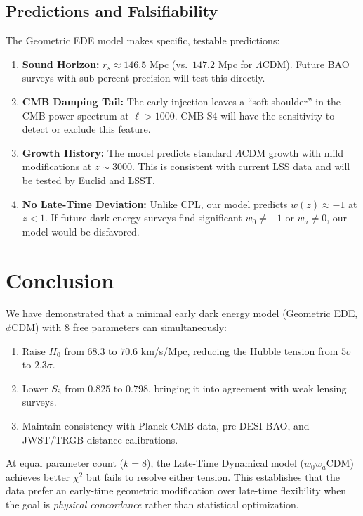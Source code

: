 \subsection{Predictions and Falsifiability}

The Geometric EDE model makes specific, testable predictions:

\begin{enumerate}
    \item \textbf{Sound Horizon:} $r_s \approx 146.5$ Mpc (vs.\ $147.2$ Mpc for $\Lambda$CDM). Future BAO surveys with sub-percent precision will test this directly.
    
    \item \textbf{CMB Damping Tail:} The early injection leaves a ``soft shoulder'' in the CMB power spectrum at $\ell > 1000$. CMB-S4 will have the sensitivity to detect or exclude this feature.
    
    \item \textbf{Growth History:} The model predicts standard $\Lambda$CDM growth with mild modifications at $z \sim 3000$. This is consistent with current LSS data and will be tested by Euclid and LSST.
    
    \item \textbf{No Late-Time Deviation:} Unlike CPL, our model predicts $w(z) \approx -1$ at $z < 1$. If future dark energy surveys find significant $w_0 \neq -1$ or $w_a \neq 0$, our model would be disfavored.
\end{enumerate}

\section{Conclusion}

We have demonstrated that a minimal early dark energy model (Geometric EDE, $\phi$CDM) with 8 free parameters can simultaneously:

\begin{enumerate}
    \item Raise $H_0$ from $68.3$ to $70.6$ km/s/Mpc, reducing the Hubble tension from $5\sigma$ to $2.3\sigma$.
    \item Lower $S_8$ from $0.825$ to $0.798$, bringing it into agreement with weak lensing surveys.
    \item Maintain consistency with Planck CMB data, pre-DESI BAO, and JWST/TRGB distance calibrations.
\end{enumerate}

At equal parameter count ($k = 8$), the Late-Time Dynamical model ($w_0w_a$CDM) achieves better $\chi^2$ but fails to resolve either tension. This establishes that the data prefer an early-time geometric modification over late-time flexibility when the goal is \emph{physical concordance} rather than statistical optimization.

